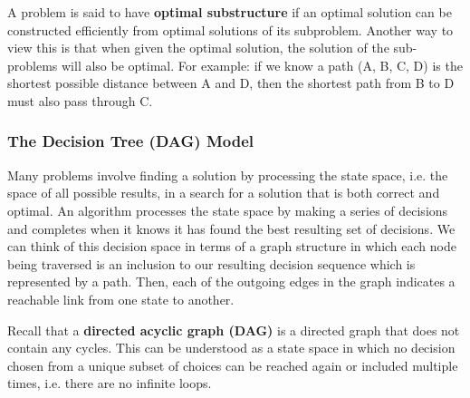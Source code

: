 \documentclass{article}
\begin{document}
    A problem is said to have \textbf{optimal substructure} if an optimal solution can be constructed efficiently from optimal solutions of its subproblem. Another way to view this is that when given the optimal solution, the solution of the sub-problems will also be optimal. For example: if we know a path (A, B, C, D) is the shortest possible distance between A and D, then the shortest path from B to D must also pass through C.
    
   \subsubsection{The Decision Tree (DAG) Model}
    Many problems involve finding a solution by processing the state space, i.e. the space of all possible results, in a search for a solution that is both correct and optimal. An algorithm processes the state space by making a series of decisions and completes when it knows it has found the best resulting set of decisions. We can think of this decision space in terms of a graph structure in which each node being traversed is an inclusion to our resulting decision sequence which is represented by a path. Then, each of the outgoing edges in the graph indicates a reachable link from one state to another. 
    
    Recall that a \textbf{directed acyclic graph (DAG)} is a directed graph that does not contain any cycles. This can be understood as a state space in which no decision chosen from a unique subset of choices can be reached again or included multiple times, i.e. there are no infinite loops.
    
\end{document}
